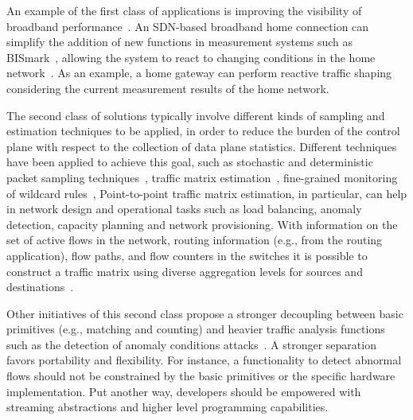 An example of the first class of applications is improving the visibility of broadband 
performance~\cite{sundaresan2011,kim2013}. An SDN-based broadband home connection can 
simplify the addition of new functions in measurement systems such as BISmark~\cite{sundaresan2011}, 
allowing the system to react to changing conditions in the home network~\cite{kim2013}. As an example, a home 
gateway can perform reactive traffic shaping considering the current measurement results of the home network.

The second class of solutions typically involve different kinds of sampling and estimation 
techniques to be applied, in order to reduce the burden of the control plane with respect to the collection of data plane statistics.
Different techniques have been applied to achieve this goal, such as stochastic and deterministic packet sampling techniques~\cite{mehdi2011}, traffic matrix estimation~\cite{tootoonchian2010-1}, fine-grained monitoring of wildcard rules~\cite{wette2013}, 
Point-to-point traffic matrix estimation, in particular, can help in network design and operational tasks such as load balancing, anomaly detection, capacity planning and 
network provisioning.
With information on the set of active flows in the network, routing information (e.g., from the routing application), flow paths, and flow counters in the switches it is possible to 
construct a traffic matrix using diverse aggregation levels for sources and destinations~\cite{tootoonchian2010-1}.

Other initiatives of this second class propose a stronger decoupling between basic primitives (e.g., matching and counting) and 
heavier traffic analysis functions such as the detection of anomaly conditions attacks~\cite{bianchi2013}.
A stronger separation favors portability and flexibility.
For instance, a functionality to detect abnormal flows should not be constrained by the basic primitives or 
the specific hardware implementation.
Put another way, developers should be empowered with streaming 
abstractions and higher level programming capabilities.

